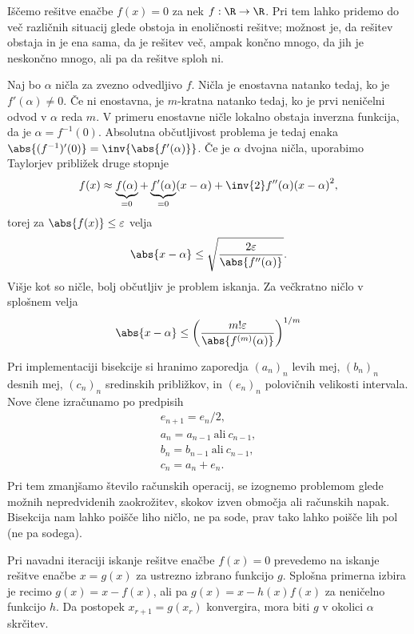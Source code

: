 
Iščemo rešitve enačbe $f(x) = 0$ za nek $f : \R \to \R$.
Pri tem lahko pridemo do več različnih situacij glede obstoja in enoličnosti
rešitve; možnost je, da rešitev obstaja in je ena sama, da je rešitev več, ampak
končno mnogo, da jih je neskončno mnogo, ali pa da rešitve sploh ni.

Naj bo $\alpha$ ničla za zvezno odvedljivo $f$.
Ničla je enostavna natanko tedaj, ko je $f'(\alpha) \ne 0$.
Če ni enostavna, je $m$-kratna natanko tedaj, ko je prvi neničelni odvod v
$\alpha$ reda $m$.
V primeru enostavne ničle lokalno obstaja inverzna funkcija, da je $\alpha =
f^{-1}(0)$.
Absolutna občutljivost problema je tedaj enaka $\abs{(f^{-1})'(0)} =
\inv{\abs{f'(\alpha)}}$.
Če je $\alpha$ dvojna ničla, uporabimo Taylorjev približek druge stopnje
\[
  f(x) \approx
  \underbrace{f(\alpha)}_{=0} + \underbrace{f'(\alpha)}_{=0} (x-\alpha) +
  \inv{2} f''(\alpha) {(x-\alpha)}^2,
\]
torej za $\abs{f(x)} \le \varepsilon$ velja
\[
  \abs{x - \alpha} \le \sqrt{ \frac{2 \varepsilon}{\abs{f''(\alpha)}} }.
\]
Višje kot so ničle, bolj občutljiv je problem iskanja.
Za večkratno ničlo v splošnem velja
\[
  \abs{x - \alpha} \le {\left( \frac{m! \varepsilon}{\abs{f^{(m)}(\alpha)}}
	\right)}^{1/m}
\]



Pri implementaciji bisekcije si hranimo zaporedja ${(a_n)}_n$ levih mej,
${(b_n)}_n$ desnih mej, ${(c_n)}_n$ sredinskih približkov, in ${(e_n)}_n$
polovičnih velikosti intervala.
Nove člene izračunamo po predpisih
\begin{gather*}
  e_{n+1} = e_n / 2, \\
  a_n = a_{n-1}\ \text{ali}\ c_{n-1}, \\
  b_n = b_{n-1}\ \text{ali}\ c_{n-1}, \\
  c_n = a_n + e_n. \\
\end{gather*}
Pri tem zmanjšamo število računskih operacij, se izognemo problemom glede možnih
nepredvidenih zaokrožitev, skokov izven območja ali računskih napak.
Bisekcija nam lahko poišče liho ničlo, ne pa sode, prav tako lahko poišče lih
pol (ne pa sodega).



Pri navadni iteraciji iskanje rešitve enačbe $f(x) = 0$ prevedemo na iskanje
rešitve enačbe $x = g(x)$ za ustrezno izbrano funkcijo $g$.
Splošna primerna izbira je recimo $g(x) = x - f(x)$, ali pa $g(x) = x - h(x)
f(x)$ za neničelno funkcijo $h$.
Da postopek $x_{r+1} = g(x_r)$ konvergira, mora biti $g$ v okolici $\alpha$
skrčitev.


